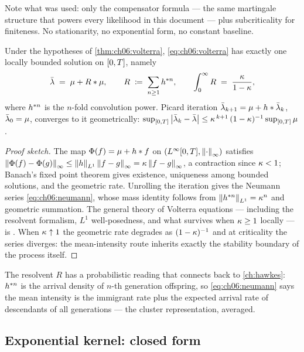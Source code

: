 Note what was used: only the compensator formula --- the same martingale
structure that powers every likelihood in this document --- plus
subcriticality for finiteness. No stationarity, no exponential form, no
constant baseline.

\begin{theorem}\label{thm:ch06:neumann}
Under the hypotheses of \cref{thm:ch06:volterra},
\cref{eq:ch06:volterra} has exactly one locally bounded solution on
$[0,T]$, namely
\begin{equation}\label{eq:ch06:neumann}
\bar{\lambda} \;=\; \mu + R * \mu,
\qquad
R \;\coloneqq\; \sum_{n\ge 1} h^{*n},
\qquad
\int_0^\infty R \;=\; \frac{\kappa}{1-\kappa},
\end{equation}
where $h^{*n}$ is the $n$-fold convolution power. Picard iteration
$\bar{\lambda}_{k+1} = \mu + h * \bar{\lambda}_k$, $\bar{\lambda}_0 = \mu$, converges
to it geometrically:
$\sup_{[0,T]}\left|\bar{\lambda}_k - \bar{\lambda}\right| \le
\kappa^{\,k+1}\,(1-\kappa)^{-1} \sup_{[0,T]}\mu$.
\end{theorem}

\begin{proof}[Proof sketch]
The map $\Phi(f) = \mu + h * f$ on
$(L^\infty[0,T], \left\lVert\cdot\right\rVert_\infty)$ satisfies
$\left\lVert\Phi(f)-\Phi(g)\right\rVert_\infty \le \left\lVert h\right\rVert_{L^1}
\left\lVert f-g\right\rVert_\infty = \kappa\left\lVert f-g\right\rVert_\infty$, a contraction since
$\kappa<1$; Banach's fixed point theorem gives existence, uniqueness among
bounded solutions, and the geometric rate. Unrolling the iteration gives
the Neumann series \cref{eq:ch06:neumann}, whose mass identity follows from
$\left\lVert h^{*n}\right\rVert_{L^1} = \kappa^n$ and geometric summation. The
general theory of Volterra equations --- including the resolvent
formalism, $L^1$ well-posedness, and what survives when
$\kappa \ge 1$ locally --- is \citet{gripenberg1990}. When
$\kappa \uparrow 1$ the geometric rate degrades as $(1-\kappa)^{-1}$ and
at criticality the series diverges: the mean-intensity route inherits
exactly the stability boundary of the process itself.
\end{proof}

The resolvent $R$ has a probabilistic reading that connects back to
\cref{ch:hawkes}: $h^{*n}$ is the arrival density of $n$-th
generation offspring, so \cref{eq:ch06:neumann} says the mean intensity is
the immigrant rate plus the expected arrival rate of descendants of all
generations --- the cluster representation, averaged.

\subsection{Exponential kernel: closed form}\label{ch06:sec:closedform}

